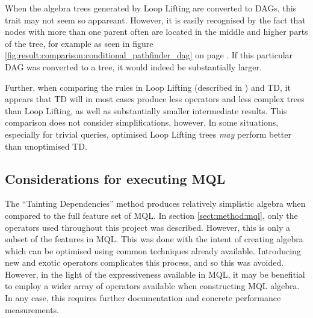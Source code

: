 When the algebra trees generated by Loop Lifting are converted to DAGs, this
trait may not seem so appareant. However, it is easily recognised by the fact
that nodes with more than one parent often are located in the middle and higher
parts of the tree, for example as seen in figure
\ref{fig:result:comparison:conditional_pathfinder_dag} on page
\pageref{fig:result:comparison:conditional_pathfinder_dag}. If this particular
DAG was converted to a tree, it would indeed be substantially larger.

Further, when comparing the rules in Loop Lifting (described in
\cite{pathfinder_mothertongue}) and TD, it appears that TD will in most cases
produce less operators and less complex trees than Loop Lifting, as well as
substantially smaller intermediate results. This comparison does not consider
simplifications, however. In some situations, especially for trivial queries,
optimised Loop Lifting trees \emph{may} perform better than unoptimised TD. 

\subsection{Considerations for executing MQL}
The ``Tainting Dependencies'' method produces relatively simplistic algebra
when compared to the full feature set of MQL. In section \ref{sect:method:mql},
only the operators used throughout this project was described. However, this is
only a subset of the features in MQL. This was done with the intent of creating
algebra which can be optimised using common techniques already available.
Introducing new and exotic operators complicates this process, and so this was
avoided. However, in the light of the expressiveness available in MQL, it may
be benefitial to employ a wider array of operators available when constructing
MQL algebra. In any case, this requires further documentation and concrete
performance measurements.